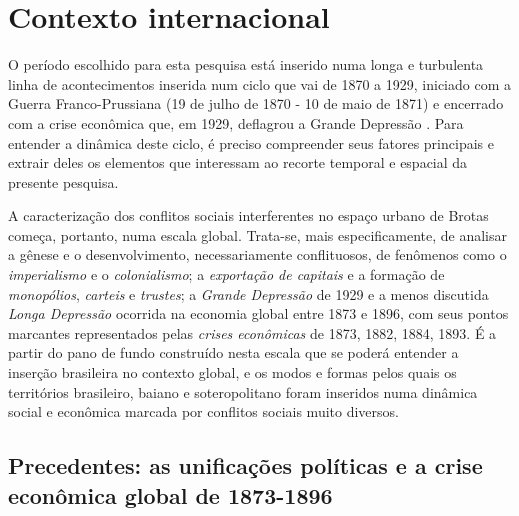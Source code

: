 \section{Contexto internacional}\label{sec:1.1}

O período escolhido para esta pesquisa está inserido numa longa e turbulenta linha de acontecimentos inserida num ciclo que vai de 1870 a 1929, iniciado com a Guerra Franco-Prussiana (19 de julho de 1870 - 10 de maio de 1871) e encerrado com a crise econômica que, em 1929, deflagrou a Grande Depressão \cite{bernardo_fascismo_2003,bukharin_imperialismo_1986,
hobsbawm_empire_1989,hobsbawm_extremes_1995,hobson_imperialism_1902,
hobson_capitmoderno_1983,KROPOTKIN1901,lenin_imperialismo_1987,luxemburg_acumula_1985,
morris_magnatas_2010}. Para entender a dinâmica deste ciclo, é preciso compreender seus fatores principais e extrair deles os elementos que interessam ao recorte temporal e espacial da presente pesquisa.

A caracterização dos conflitos sociais interferentes no espaço urbano de Brotas começa, portanto, numa escala global. Trata-se, mais especificamente, de analisar a gênese e o desenvolvimento, necessariamente conflituosos, de fenômenos como o \textit{imperialismo} e o \textit{colonialismo}; a \textit{exportação de capitais} e a formação de \textit{monopólios}, \textit{carteis} e \textit{trustes}; a \textit{Grande Depressão} de 1929 e a menos discutida \textit{Longa Depressão} ocorrida na economia global entre 1873 e 1896, com seus pontos marcantes representados pelas \textit{crises econômicas} de 1873, 1882, 1884, 1893. É a partir do pano de fundo construído nesta escala que se poderá entender a inserção brasileira no contexto global, e os modos e formas pelos quais os territórios brasileiro, baiano e soteropolitano foram inseridos numa dinâmica social e econômica marcada por conflitos sociais muito diversos.

\subsection{Precedentes: as unificações políticas e a crise econômica global de 1873-1896}

